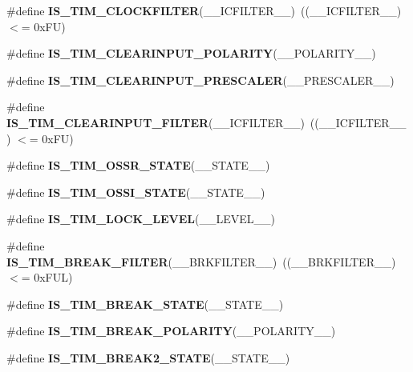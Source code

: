 \begin{DoxyCompactItemize}
\item 
\mbox{\label{group___t_i_m___private___macros_ga7e2a89ace1305fce9bec2cf6d290389f}} 
\#define {\bfseries I\+S\+\_\+\+T\+I\+M\+\_\+\+C\+L\+O\+C\+K\+F\+I\+L\+T\+ER}(\+\_\+\+\_\+\+I\+C\+F\+I\+L\+T\+E\+R\+\_\+\+\_\+)~((\+\_\+\+\_\+\+I\+C\+F\+I\+L\+T\+E\+R\+\_\+\+\_\+) $<$= 0x\+F\+U)
\item 
\#define {\bfseries I\+S\+\_\+\+T\+I\+M\+\_\+\+C\+L\+E\+A\+R\+I\+N\+P\+U\+T\+\_\+\+P\+O\+L\+A\+R\+I\+TY}(\+\_\+\+\_\+\+P\+O\+L\+A\+R\+I\+T\+Y\+\_\+\+\_\+)
\item 
\#define {\bfseries I\+S\+\_\+\+T\+I\+M\+\_\+\+C\+L\+E\+A\+R\+I\+N\+P\+U\+T\+\_\+\+P\+R\+E\+S\+C\+A\+L\+ER}(\+\_\+\+\_\+\+P\+R\+E\+S\+C\+A\+L\+E\+R\+\_\+\+\_\+)
\item 
\mbox{\label{group___t_i_m___private___macros_gaf8f726fb3929b2fe50099b21eec9a738}} 
\#define {\bfseries I\+S\+\_\+\+T\+I\+M\+\_\+\+C\+L\+E\+A\+R\+I\+N\+P\+U\+T\+\_\+\+F\+I\+L\+T\+ER}(\+\_\+\+\_\+\+I\+C\+F\+I\+L\+T\+E\+R\+\_\+\+\_\+)~((\+\_\+\+\_\+\+I\+C\+F\+I\+L\+T\+E\+R\+\_\+\+\_\+) $<$= 0x\+F\+U)
\item 
\#define {\bfseries I\+S\+\_\+\+T\+I\+M\+\_\+\+O\+S\+S\+R\+\_\+\+S\+T\+A\+TE}(\+\_\+\+\_\+\+S\+T\+A\+T\+E\+\_\+\+\_\+)
\item 
\#define {\bfseries I\+S\+\_\+\+T\+I\+M\+\_\+\+O\+S\+S\+I\+\_\+\+S\+T\+A\+TE}(\+\_\+\+\_\+\+S\+T\+A\+T\+E\+\_\+\+\_\+)
\item 
\#define {\bfseries I\+S\+\_\+\+T\+I\+M\+\_\+\+L\+O\+C\+K\+\_\+\+L\+E\+V\+EL}(\+\_\+\+\_\+\+L\+E\+V\+E\+L\+\_\+\+\_\+)
\item 
\mbox{\label{group___t_i_m___private___macros_ga6eb4b934436eb7afd965214963abfb62}} 
\#define {\bfseries I\+S\+\_\+\+T\+I\+M\+\_\+\+B\+R\+E\+A\+K\+\_\+\+F\+I\+L\+T\+ER}(\+\_\+\+\_\+\+B\+R\+K\+F\+I\+L\+T\+E\+R\+\_\+\+\_\+)~((\+\_\+\+\_\+\+B\+R\+K\+F\+I\+L\+T\+E\+R\+\_\+\+\_\+) $<$= 0x\+F\+U\+L)
\item 
\#define {\bfseries I\+S\+\_\+\+T\+I\+M\+\_\+\+B\+R\+E\+A\+K\+\_\+\+S\+T\+A\+TE}(\+\_\+\+\_\+\+S\+T\+A\+T\+E\+\_\+\+\_\+)
\item 
\#define {\bfseries I\+S\+\_\+\+T\+I\+M\+\_\+\+B\+R\+E\+A\+K\+\_\+\+P\+O\+L\+A\+R\+I\+TY}(\+\_\+\+\_\+\+P\+O\+L\+A\+R\+I\+T\+Y\+\_\+\+\_\+)
\item 
\#define {\bfseries I\+S\+\_\+\+T\+I\+M\+\_\+\+B\+R\+E\+A\+K2\+\_\+\+S\+T\+A\+TE}(\+\_\+\+\_\+\+S\+T\+A\+T\+E\+\_\+\+\_\+)

\end{DoxyCompactItemize}
